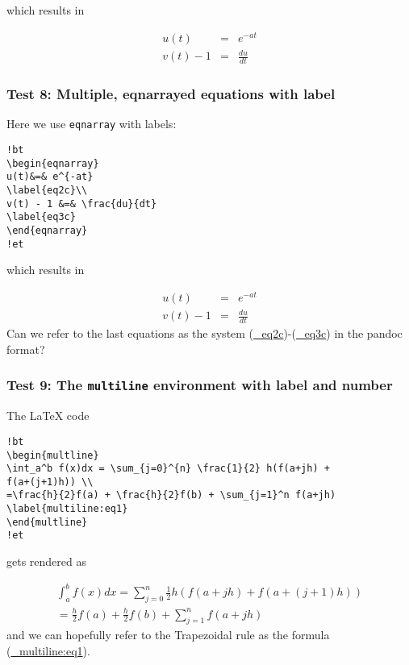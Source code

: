 \documentclass[]{article}
\begin{document}
which results in

\[
\begin{eqnarray*}
u(t)&=& e^{-at}\\ 
v(t) - 1 &=& \frac{du}{dt}
\end{eqnarray*}
\]

\subsubsection{Test 8: Multiple, eqnarrayed equations with
label}\label{test-8-multiple-eqnarrayed-equations-with-label}

Here we use \texttt{eqnarray} with labels:

\begin{verbatim}
!bt
\begin{eqnarray}
u(t)&=& e^{-at}
\label{eq2c}\\ 
v(t) - 1 &=& \frac{du}{dt}
\label{eq3c}
\end{eqnarray}
!et
\end{verbatim}

which results in

\[
\begin{eqnarray}
u(t)&=& e^{-at} \label{_eq2c}\\ 
v(t) - 1 &=& \frac{du}{dt} \label{_eq3c}
\end{eqnarray}
\] Can we refer to the last equations as the system
(\protect\hyperlink{_eq2c}{\_eq2c})-(\protect\hyperlink{_eq3c}{\_eq3c})
in the pandoc format?

\subsubsection{\texorpdfstring{Test 9: The \texttt{multiline}
environment with label and
number}{Test 9: The multiline environment with label and number}}\label{test-9-the-multiline-environment-with-label-and-number}

The LaTeX code

\begin{verbatim}
!bt
\begin{multline}
\int_a^b f(x)dx = \sum_{j=0}^{n} \frac{1}{2} h(f(a+jh) +
f(a+(j+1)h)) \\ 
=\frac{h}{2}f(a) + \frac{h}{2}f(b) + \sum_{j=1}^n f(a+jh)
\label{multiline:eq1}
\end{multline}
!et
\end{verbatim}

gets rendered as

\[
\begin{multline}
\int_a^b f(x)dx = \sum_{j=0}^{n} \frac{1}{2} h(f(a+jh) +
f(a+(j+1)h)) \\ 
=\frac{h}{2}f(a) + \frac{h}{2}f(b) + \sum_{j=1}^n f(a+jh)
\label{_multiline:eq1}
\end{multline}
\] and we can hopefully refer to the Trapezoidal rule as the formula
(\protect\hyperlink{_multiline:eq1}{\_multiline:eq1}).
\end{document}

